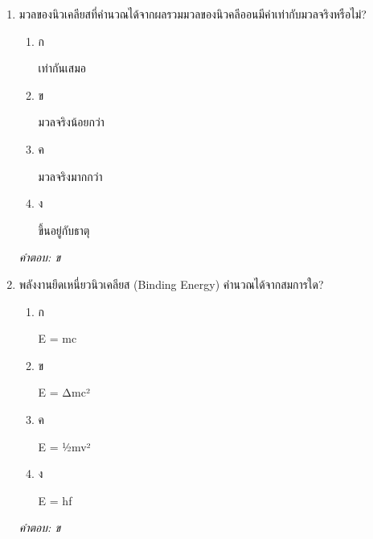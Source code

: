 \documentclass[12pt]{article}
\begin{document}
\begin{enumerate}[label=\arabic*., itemsep=0.5\baselineskip, topsep=0.5\baselineskip, leftmargin=*]
\item มวลของนิวเคลียสที่คำนวณได้จากผลรวมมวลของนิวคลีออนมีค่าเท่ากับมวลจริงหรือไม่?
\begin{enumerate}[label=\alph*)., itemsep=0.3\baselineskip, topsep=0.3\baselineskip]
\item ก\ 
\begin{minipage}[t]{0.9\linewidth}
\raggedright เท่ากันเสมอ
\end{minipage}
\item ข\ 
\begin{minipage}[t]{0.9\linewidth}
\raggedright มวลจริงน้อยกว่า
\end{minipage}
\item ค\ 
\begin{minipage}[t]{0.9\linewidth}
\raggedright มวลจริงมากกว่า
\end{minipage}
\item ง\ 
\begin{minipage}[t]{0.9\linewidth}
\raggedright ขึ้นอยู่กับธาตุ
\end{minipage}
\end{enumerate}
\vspace{-0.3\baselineskip}
\begin{small}
\textit{คำตอบ: ข}
\end{small}

\item พลังงานยึดเหนี่ยวนิวเคลียส (Binding Energy) คำนวณได้จากสมการใด?
\begin{enumerate}[label=\alph*)., itemsep=0.3\baselineskip, topsep=0.3\baselineskip]
\item ก\ 
\begin{minipage}[t]{0.9\linewidth}
\raggedright E = mc
\end{minipage}
\item ข\ 
\begin{minipage}[t]{0.9\linewidth}
\raggedright E = Δmc²
\end{minipage}
\item ค\ 
\begin{minipage}[t]{0.9\linewidth}
\raggedright E = ½mv²
\end{minipage}
\item ง\ 
\begin{minipage}[t]{0.9\linewidth}
\raggedright E = hf
\end{minipage}
\end{enumerate}
\vspace{-0.3\baselineskip}
\begin{small}
\textit{คำตอบ: ข}
\end{small}


\end{enumerate}
\end{document}
